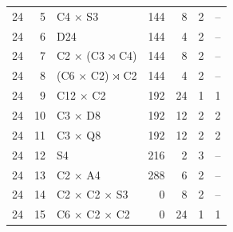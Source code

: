 {\begin{longtable}{rrlrrrr}
24 & 5 & C4 $\times$ S3 & 144 & 8 & 2 & --\\
24 & 6 & D24 & 144 & 4 & 2 & --\\
24 & 7 & C2 $\times$ (C3 $\rtimes$ C4) & 144 & 8 & 2 & --\\
24 & 8 & (C6 $\times$ C2) $\rtimes$ C2 & 144 & 4 & 2 & --\\
24 & 9 & C12 $\times$ C2 & 192 & 24 & 1 & 1\\
24 & 10 & C3 $\times$ D8 & 192 & 12 & 2 & 2\\
24 & 11 & C3 $\times$ Q8 & 192 & 12 & 2 & 2\\
24 & 12 & S4 & 216 & 2 & 3 & --\\
24 & 13 & C2 $\times$ A4 & 288 & 6 & 2 & --\\
24 & 14 & C2 $\times$ C2 $\times$ S3 & 0 & 8 & 2 & --\\
24 & 15 & C6 $\times$ C2 $\times$ C2 & 0 & 24 & 1 & 1\\
\end{longtable}}

